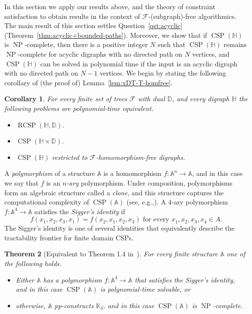 \documentclass{article}
\newtheorem{theorem}{Theorem}
\newtheorem{corollary}[theorem]{Corollary}
\theoremstyle{definition}
\theoremstyle{remark}
\DeclareMathOperator{\NP}{NP}
\DeclareMathOperator{\CSP}{CSP}
\DeclareMathOperator{\RCSP}{RCSP}
\newcommand{\bA}{{\mathbb A}}
\newcommand{\bD}{{\mathbb D}}
\newcommand{\bH}{{\mathbb H}}
\newcommand{\bK}{{\mathbb K}}
\newcommand{\calF}{{\mathcal F}}
\begin{document}
In this section we apply our results above, and the theory of constraint satisfaction to
obtain results in the context of $\calF$-(subgraph)-free algorithmics. 
The main result of this section settles Question~\ref{qst:acyclic}
(Theorem~\ref{thm:acyclic+bounded-paths}). Moreover, we show that 
if $\CSP(\bH)$ is $\NP$-complete, then there is a positive integer $N$ such that
$\CSP(\bH)$ remains $\NP$-complete for acyclic digraphs with no directed path on
$N$ vertices, and $\CSP(\bH)$ can be solved in polynomial time if the input is an
acyclic digraph with no directed path on $N-1$ vertices.
We begin by stating the following corollary of (the proof of) Lemma~\ref{lem:xDT-T-homfree}.

\begin{corollary}\label{cor:trees-hom-free}
    For every finite set of trees $\calF$ with dual $\bD$, and every digraph $\bH$ the following 
    problems are polynomial-time equivalent.
    \begin{itemize}
        \item $\RCSP(\bH,\bD)$.
        \item $\CSP(\bH\times \bD)$.
        \item $\CSP(\bH)$ restricted to $\calF$-homomorphism-free digraphs.
    \end{itemize}
\end{corollary}


A \emph{polymorphism} of a structure $\bA$ is a homomorphism $f\colon \bA^n\to \bA$, and in 
this case we say that $f$ is an \emph{$n$-ary} polymorphism. Under composition, polymorphisms
form an algebraic structure called a \emph{clone}, and this structure captures the
computational complexity of $\CSP(\bA)$ (see, e.g.,\cite{Pol}). A $4$-ary polymorphism
$f\colon \bA^4\to \bA$ satisfies the \emph{Sigger's identity} if 
\[
    f(x_1,x_2,x_3,x_1) = f(x_2,x_1,x_2,x_3) \text{ for every } x_1,x_2,x_3,x_4\in A.
\]
The Sigger's identity is one of several identities that equivalently describe the tractability
frontier for finite domain CSPs.

\begin{theorem}
[Equivalent to Theorem 1.4 in~\cite{Zhuk20}]
\label{thm:finite-domain-dichotomy}
    For every finite structure $\bA$ one of the following holds.
    \begin{itemize}
        \item Either $\bA$ has a polymorphism $f\colon \bA^4\to \bA$ that satisfies the
        Sigger's identity, and in this case $\CSP(\bA)$ is polynomial-time solvable, or
        \item otherwise, $\bA$ pp-constructs $\bK_3$, and in this case $\CSP(\bA)$ is $\NP$-complete.
    \end{itemize}
\end{theorem}
\end{document}
